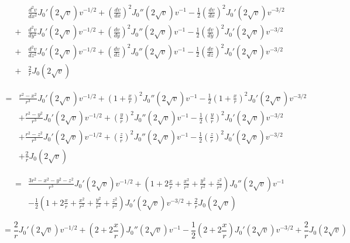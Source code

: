 \documentclass{article}
\begin{document}
\begin{equation*}
\begin{aligned}
&\frac{d^2 v}{d x^2} J_0'(2\sqrt{v}) v^{-1/2} + \left(\frac{d v}{d x}\right)^2 J_0''(2\sqrt{v}) v^{-1} - \frac{1}{2} \left(\frac{d v}{d x}\right)^2 J_0'(2\sqrt{v}) v^{-3/2} \\
+& \frac{d^2 v}{d y^2} J_0'(2\sqrt{v}) v^{-1/2} + \left(\frac{d v}{d y}\right)^2 J_0''(2\sqrt{v}) v^{-1} - \frac{1}{2} \left(\frac{d v}{d y}\right)^2 J_0'(2\sqrt{v}) v^{-3/2} \\
+& \frac{d^2 v}{d z^2} J_0'(2\sqrt{v}) v^{-1/2} + \left(\frac{d v}{d z}\right)^2 J_0''(2\sqrt{v}) v^{-1} - \frac{1}{2} \left(\frac{d v}{d z}\right)^2 J_0'(2\sqrt{v}) v^{-3/2} \\
+& \frac{2}{r} J_0(2\sqrt{v})
\end{aligned}
\end{equation*}

\begin{equation*}
\begin{aligned}
=&\frac{r^2-x^2}{r^3} J_0'(2\sqrt{v}) v^{-1/2} + (1+\frac{x}{r})^2 J_0''(2\sqrt{v}) v^{-1} - \frac{1}{2} (1+\frac{x}{r})^2 J_0'(2\sqrt{v}) v^{-3/2} \\
&+ \frac{r^2-y^2}{r^3} J_0'(2\sqrt{v}) v^{-1/2} + \left(\frac{y}{r}\right)^2 J_0''(2\sqrt{v}) v^{-1} - \frac{1}{2} \left(\frac{y}{r}\right)^2 J_0'(2\sqrt{v}) v^{-3/2} \\
&+ \frac{r^2-z^2}{r^3} J_0'(2\sqrt{v}) v^{-1/2} + \left(\frac{z}{r}\right)^2 J_0''(2\sqrt{v}) v^{-1} - \frac{1}{2} \left(\frac{z}{r}\right)^2 J_0'(2\sqrt{v}) v^{-3/2} \\
&+ \frac{2}{r} J_0(2\sqrt{v})
\end{aligned}
\end{equation*}

\begin{equation*}
\begin{aligned}
=&\frac{3r^2-x^2-y^2-z^2}{r^3} J_0'(2\sqrt{v}) v^{-1/2} + (1+2\frac{x}{r} +\frac{x^2}{r^2} + \frac{y^2}{r^2} + \frac{z^2}{r^2}) J_0''(2\sqrt{v}) v^{-1} \\
&- \frac{1}{2} (1+2\frac{x}{r} +\frac{x^2}{r^2}+ \frac{y^2}{r^2} + \frac{z^2}{r^2}) J_0'(2\sqrt{v}) v^{-3/2}
+ \frac{2}{r} J_0(2\sqrt{v})
\end{aligned}
\end{equation*}

\begin{equation*}
=\frac{2}{r} J_0'(2\sqrt{v}) v^{-1/2} + (2+2\frac{x}{r}) J_0''(2\sqrt{v}) v^{-1} - \frac{1}{2} (2+2\frac{x}{r}) J_0'(2\sqrt{v}) v^{-3/2} + \frac{2}{r} J_0(2\sqrt{v})
\end{equation*}
\end{document}
